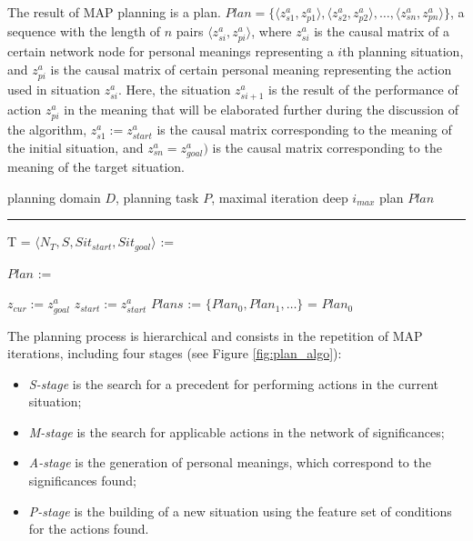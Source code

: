 \documentclass[review]{elsarticle}
\begin{document}
The result of MAP planning is a plan. $Plan=\{\langle z_{s1}^a,z_{p1}^a\rangle, \langle z_{s2}^a,z_{p2}^a\rangle,\dots, \langle z_{sn}^a,z_{pn}^a\rangle\}$, a sequence with the length of $n$ pairs $\langle z_{si}^a,z_{pi}^a\rangle$, where $z_{si}^a$ is the causal matrix of a certain network node for personal meanings representing a $i$th planning situation, and $z_{pi}^a$ is the causal matrix of certain personal meaning representing the action used in situation $z_{si}^a$. Here, the situation $z_{si+1}^a$ is the result of the performance of action $z_{pi}^a$ in the meaning that will be elaborated further during the discussion of the algorithm, $z_{s1}^a := z_{start}^a$ is the causal matrix corresponding to the meaning of the initial situation, and $z_{sn}^a=z_{goal}^a)$ is the causal matrix corresponding to the meaning of the target situation.

\begin{algorithm}[H]
	\label{alg:plan}
	\begin{algorithmic}[1]
		\Require planning domain $D$, planning task $P$, maximal iteration deep $i_{max}$
		\Ensure plan $Plan$
		
		\vspace*{1pt}
		\hrule
		\vspace*{5pt}
		
		\State T = $\langle N_T,S,Sit_{start}, Sit_{goal}\rangle$ := \label{alst:ground}
		
		\Statex{}
		\State $Plan$ := 
		
		
		\State $z_{cur} := z_{goal}^a$
		\State $z_{start} := z_{start}^a$
		\State $Plans$ := \label{alst:start_iter}
		\State $\{Plan_0, Plan_1,\dots\}$ = \label{alst:sort}
		\State\Return $Plan_0$\label{alst:return}
		\EndFunction
	\end{algorithmic}
\end{algorithm}

The planning process is hierarchical and consists in the repetition of MAP iterations, including four stages (see Figure \ref{fig:plan_algo}):
\begin{itemize}
	\item \textit{S-stage} is the search for a precedent for performing actions in the current situation;
	\item \textit{M-stage} is the search for applicable actions in the network of significances;
	\item \textit{A-stage} is the generation of personal meanings, which correspond to the significances found;
	\item \textit{P-stage} is the building of a new situation using the feature set of conditions for the actions found.
\end{itemize}
\end{document}
